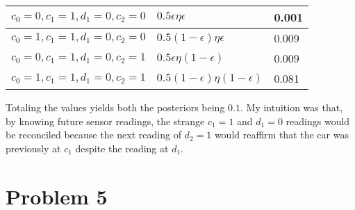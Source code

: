 \documentclass[12pt]{article}
\begin{document}
\begin{enumerate}[label=(\alph*)]
		\begin{tabular}{| l | l | l |}
			\hline
			\(c_0 = 0, c_1 = 1, d_1 = 0, c_2 = 0\) &
				\(0.5 \epsilon \eta \epsilon\) & 0.001\\ \hline
			\(c_0 = 1, c_1 = 1, d_1 = 0, c_2 = 0\) &
			   \(0.5 (1-\epsilon) \eta \epsilon\) & 0.009\\ \hline
			\(c_0 = 0, c_1 = 1, d_1 = 0, c_2 = 1\) &
			   \(0.5 \epsilon \eta (1-\epsilon)\) & 0.009\\ \hline
			\(c_0 = 1, c_1 = 1, d_1 = 0, c_2 = 1\) &
			   \(0.5 (1-\epsilon) \eta (1-\epsilon)\) & 0.081\\ \hline
		\end{tabular}

		Totaling the values yields both the posteriors being \(0.1\).
		My intuition was that, by knowing future sensor readings, the
		strange \(c_1 = 1\) and \(d_1 = 0\) readings would be reconciled
		because the next reading of \(d_2 = 1\) would reaffirm that
		the car was previously at \(c_1\) despite the reading at \(d_1\).

\end{enumerate}

\section*{Problem 5}
\end{document}

